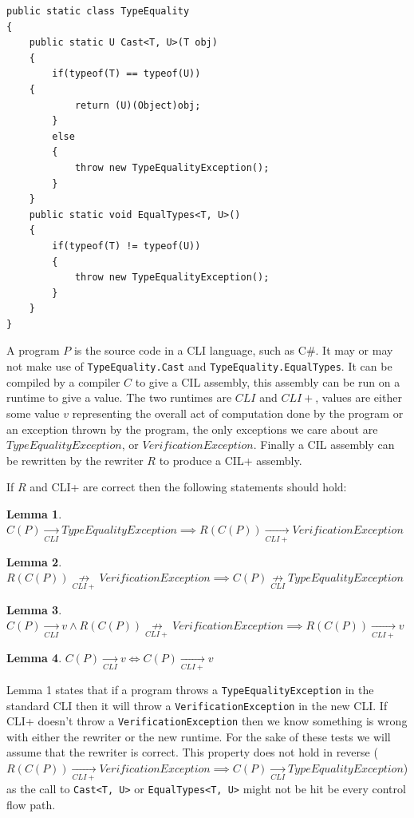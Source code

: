 \documentclass[english]{report}
\newtheorem{lemma}{Lemma}
\begin{document}
\begin{lstlisting}[caption={Cast},keywordstyle={\color{blue}},language=sharpc]
public static class TypeEquality
{
	public static U Cast<T, U>(T obj)
	{
		if(typeof(T) == typeof(U))
    {
			return (U)(Object)obj;
		}
		else
		{
			throw new TypeEqualityException();
		}
	}
	public static void EqualTypes<T, U>()
	{
		if(typeof(T) != typeof(U))
		{
			throw new TypeEqualityException();
		}
	}
}
\end{lstlisting}


A program $P$ is the source code in a CLI language, such as C\#. It may or may
not make use of \texttt{TypeEquality.Cast} and
\texttt{TypeEquality.EqualTypes}. It can be compiled by a compiler $C$ to give
a CIL assembly, this assembly can be run on a runtime to give a value. The two
runtimes are $CLI$ and $CLI+$, values are either some value $v$ representing
the overall act of computation done by the program or an exception thrown by
the program, the only exceptions we care about are $TypeEqualityException$, or
$VerificationException$.  Finally a CIL assembly can be rewritten by the
rewriter $R$ to produce a CIL+ assembly.

If $R$ and CLI+ are correct then the following statements should hold:
\begin{lemma}
$C(P) \underset{CLI}{\rightarrow} TypeEqualityException \implies R(C(P))
\underset{CLI+}{\rightarrow} VerificationException$
\end{lemma}
\begin{lemma}
$R(C(P)) \underset{CLI+}{\not\rightarrow} VerificationException \implies
C(P) \underset{CLI}{\not\rightarrow} TypeEqualityException$
\end{lemma}
\begin{lemma}
$C(P) \underset{CLI}{\rightarrow} v \wedge R(C(P))
\underset{CLI+}{\not\rightarrow} VerificationException \implies R(C(P))
\underset{CLI+}{\rightarrow} v$
\end{lemma}
\begin{lemma}
$C(P) \underset{CLI}{\rightarrow} v \iff C(P) \underset{CLI+}{\rightarrow} v$
\end{lemma}

Lemma 1 states that if a program throws a \texttt{TypeEqualityException} in
the standard CLI then it will throw a \texttt{VerificationException} in the new
CLI. If CLI+ doesn't throw a \texttt{VerificationException} then we know
something is wrong with either the rewriter or the new runtime. For the sake of
these tests we will assume that the rewriter is correct. This property does not
hold in reverse ($R(C(P)) \underset{CLI+}{\rightarrow} VerificationException
\implies C(P) \underset{CLI}{\rightarrow} TypeEqualityException$) as the call
to \texttt{Cast<T, U>} or \texttt{EqualTypes<T, U>} might not be hit be every
control flow path.
\end{document}
